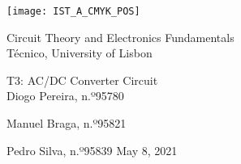 
\thispagestyle {empty}

\texttt{[image: IST\_A\_CMYK\_POS]}

\begin{center}
%
\vspace{1.0cm}

\vspace{1cm}
{\FontLb Circuit Theory and Electronics Fundamentals} \\ %
\vspace{1cm}
{\FontSn Técnico, University of Lisbon} \\ %
\vspace{1cm}

{\FontSn T3: AC/DC Converter Circuit} \\
\vspace{1cm}
{\FontSn Diogo Pereira, n.º95780}
\par{\FontSn Manuel Braga, n.º95821}
\par{\FontSn Pedro Silva, n.º95839}
\vspace{1.0cm}
{\FontSn May 8, 2021} \\ %
%
\end{center}

